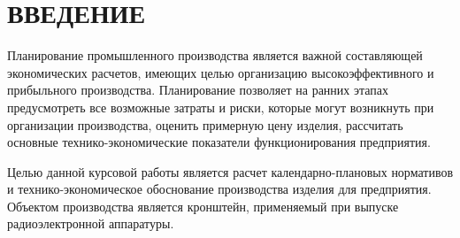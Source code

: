 \section*{ВВЕДЕНИЕ}

Планирование промышленного производства является важной составляющей 
экономических расчетов, имеющих целью организацию высокоэффективного 
и прибыльного производства.
Планирование позволяет на ранних этапах предусмотреть все возможные затраты и
риски, которые могут возникнуть при организации производства,
оценить примерную цену изделия,
рассчитать основные технико-экономические показатели функционирования предприятия.

Целью данной курсовой работы является расчет календарно-плановых нормативов
и технико-экономическое обоснование производства изделия для предприятия.
Объектом производства является кронштейн, применяемый при выпуске
радиоэлектронной аппаратуры.
